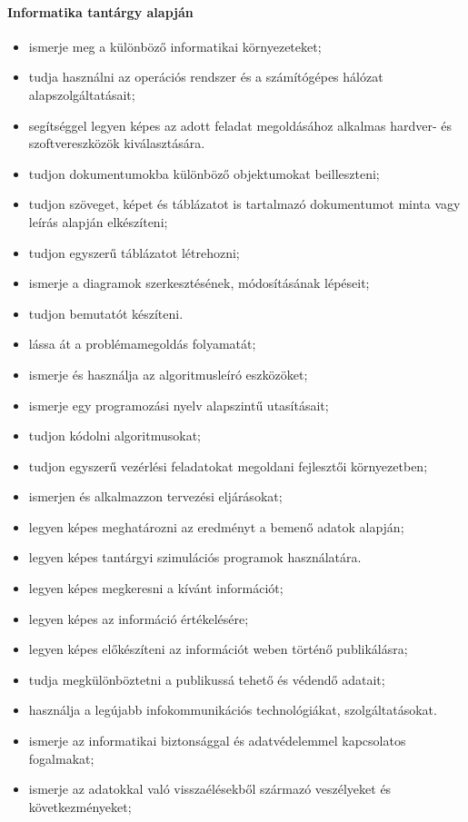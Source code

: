 \paragraph{Informatika tantárgy alapján}
\begin{itemize}
\item ismerje meg a különböző informatikai környezeteket;
\item tudja használni az operációs rendszer és a számítógépes hálózat alapszolgáltatásait;
\item segítséggel legyen képes az adott feladat megoldásához alkalmas hardver- és szoftvereszközök kiválasztására.
\item tudjon dokumentumokba különböző objektumokat beilleszteni;
\item tudjon szöveget, képet és táblázatot is tartalmazó dokumentumot minta vagy leírás alapján elkészíteni;
\item tudjon egyszerű táblázatot létrehozni;
\item ismerje a diagramok szerkesztésének, módosításának lépéseit;
\item tudjon bemutatót készíteni.
\item lássa át a problémamegoldás folyamatát;
\item ismerje és használja az algoritmusleíró eszközöket;
\item ismerje egy programozási nyelv alapszintű utasításait;
\item tudjon kódolni algoritmusokat;
\item tudjon egyszerű vezérlési feladatokat megoldani fejlesztői környezetben;
\item ismerjen és alkalmazzon tervezési eljárásokat;
\item legyen képes meghatározni az eredményt a bemenő adatok alapján;
\item legyen képes tantárgyi szimulációs programok használatára.
\item legyen képes megkeresni a kívánt információt;
\item legyen képes az információ értékelésére;
\item legyen képes előkészíteni az információt weben történő publikálásra;
\item tudja megkülönböztetni a publikussá tehető és védendő adatait;
\item használja a legújabb infokommunikációs technológiákat, szolgáltatásokat.
\item ismerje az informatikai biztonsággal és adatvédelemmel kapcsolatos fogalmakat;
\item ismerje az adatokkal való visszaélésekből származó veszélyeket és következményeket;

\end{itemize}

